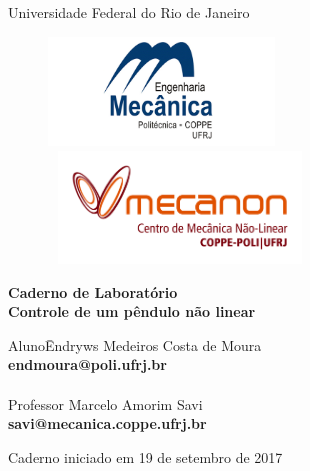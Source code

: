 \documentclass[idxtotoc,hyperref,openany]{labbook} %
\begin{document}

\begin{titlepage}
	\begin{center}
		\huge{Universidade Federal do Rio de Janeiro}

\vspace{10pt}
\begin{figure}[!ht]
\centering
\includegraphics[width=6cm]{mec.jpg}
\hspace{1cm}
\includegraphics[height=3cm, width=7cm]{Mecanon.jpg}
\end{figure}
        
        \vspace{85pt}
        
		\textbf{\LARGE{Caderno de Laboratório}}
		\large{\\ \textbf{Controle de um pêndulo não linear}}
		\vspace{160pt}
		
	\end{center}
	
	\begin{flushleft}
		\begin{tabbing}
			Aluno\qquad\qquad\= Endryws Medeiros Costa de Moura\\
			\>\hspace{7mm}\textbf{endmoura@poli.ufrj.br}\\
			\\
			
			Professor\> Marcelo Amorim Savi \\
			\>\hspace{-5mm}\textbf{savi@mecanica.coppe.ufrj.br}
		
	\end{tabbing}
		  
	\end{flushleft}
	
	\begin{center}
		\vspace{\fill}
		Caderno iniciado em 19 de setembro de 2017
	\end{center}
\end{titlepage}

\tableofcontents


\newpage




\end{document}
